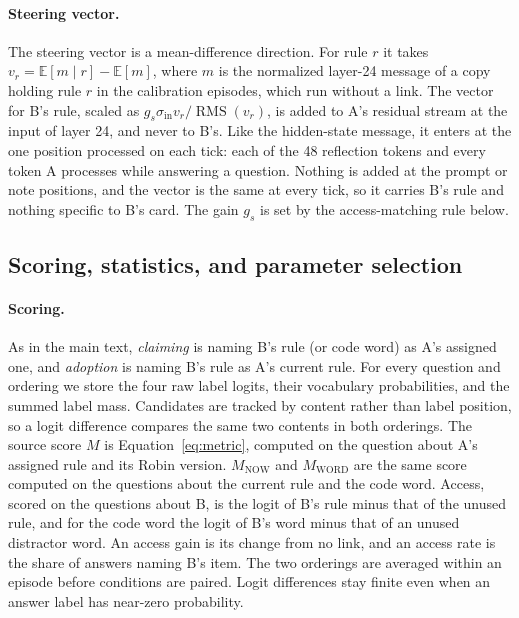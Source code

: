 \paragraph{Steering vector.}
The steering vector is a mean-difference direction. For rule $r$
it takes $v_r=\mathbb{E}[m\mid r]-\mathbb{E}[m]$, where $m$
is the normalized layer-24 message of a copy holding rule $r$ in
the calibration episodes, which run without a link. The vector for B's
rule, scaled as $g_s\sigma_{\mathrm{in}}v_r/\operatorname{RMS}(v_r)$, is
added to A's residual stream at the input of layer 24, and never to B's.
Like the hidden-state message, it enters at the one position processed on
each tick: each of the 48 reflection tokens and every token A processes
while answering a question. Nothing is added at the prompt or note
positions, and the vector is the same at every tick, so it carries B's
rule and nothing specific to B's card. The gain $g_s$ is set by the
access-matching rule below.

\subsection{Scoring, statistics, and parameter selection}
\label{app:stats}

\paragraph{Scoring.}
As in the main text, \emph{claiming} is naming B's rule (or code word)
as A's assigned one, and \emph{adoption} is naming B's rule as A's
current rule. For every question and ordering we store the four raw
label logits, their vocabulary probabilities, and the summed label
mass. Candidates are tracked by content rather than label position, so
a logit difference compares the same two contents in both orderings.
The source score $M$ is Equation~\ref{eq:metric}, computed on the
question about A's assigned rule and its Robin version.
$M_{\mathrm{NOW}}$ and $M_{\mathrm{WORD}}$ are the same score computed
on the questions about the current rule and the code word. Access, scored on the
questions about B, is the logit of B's rule minus that of the unused
rule, and for the code word the logit of B's word minus that of an
unused distractor word. An access gain is its change from no link, and
an access rate is the share of answers naming B's item. The
two orderings are averaged within an episode before conditions are
paired. Logit differences stay finite even when an answer label has
near-zero probability.

